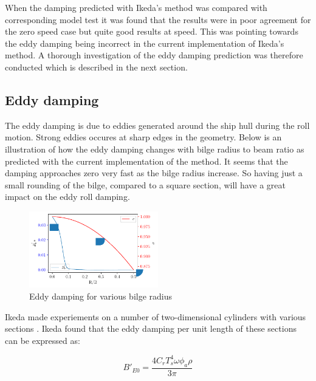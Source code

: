     When the damping predicted with Ikeda's method was compared with
corresponding model test it was found that the results were in poor
agreement for the zero speed case but quite good results at speed. This
was pointing towards the eddy damping being incorrect in the current
implementation of Ikeda's method. A thorough investigation of the eddy
damping prediction was therefore conducted which is described in the
next section.

    \subsection*{Eddy damping}\label{eddy-damping}

The eddy damping is due to eddies generated around the ship hull during
the roll motion. Strong eddies occures at sharp edges in the geometry.
Below is an illustration of how the eddy damping changes with bilge
radius to beam ratio as predicted with the current implementation of the
method. It seems that the damping approaches zero very fast as the bilge
radius increase. So having just a small rounding of the bilge, compared
to a square section, will have a great impact on the eddy roll damping.

    \begin{figure}[H]
        \begin{center}\includegraphics[width = 0.5\textwidth]{figures/eddy_sigma.pdf}\end{center}
        \vspace{-1cm}
        \caption{Eddy damping for various bilge radius}
        \label{fig:eddy_sigma}
    \end{figure}
    
    Ikeda made experiements on a number of two-dimensional cylinders with
various sections \citep{7505983/4AFVVGNT}. Ikeda found that the eddy
damping per unit length of these sections can be expressed as: 
 
            
    
    \begin{equation}
B'_{E0} = \frac{4 C_{r} T_{s}^{4} \omega \phi_{a} \rho}{3 \pi}
\label{eq:eddy_section}
\end{equation}

